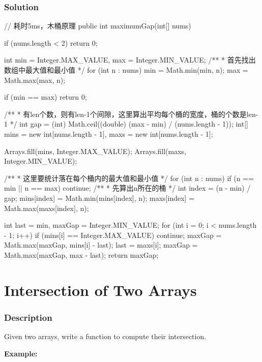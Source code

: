 \subsubsection{Solution}

\begin{Code}
// 耗时5ms，木桶原理
public int maximumGap(int[] nums) {
    if (nums.length < 2) {
        return 0;
    }

    int min = Integer.MAX_VALUE, max = Integer.MIN_VALUE;
    /**
     * 首先找出数组中最大值和最小值
     */
    for (int n : nums) {
        min = Math.min(min, n);
        max = Math.max(max, n);
    }

    if (min == max) {
        return 0;
    }

    /**
     * 有len个数，则有len-1个间隙，这里算出平均每个桶的宽度，桶的个数是len-1
     */
    int gap = (int) Math.ceil((double) (max - min) / (nums.length - 1));
    int[] mins = new int[nums.length - 1], maxs = new int[nums.length - 1];

    Arrays.fill(mins, Integer.MAX_VALUE);
    Arrays.fill(maxs, Integer.MIN_VALUE);

    /**
     * 这里要统计落在每个桶内的最大值和最小值
     */
    for (int n : nums) {
        if (n == min || n == max) {
            continue;
        }
        /**
         * 先算出n所在的桶
         */
        int index = (n - min) / gap;
        mins[index] = Math.min(mins[index], n);
        maxs[index] = Math.max(maxs[index], n);
    }

    int last = min, maxGap = Integer.MIN_VALUE;
    for (int i = 0; i < nums.length - 1; i++) {
        if (mins[i] == Integer.MAX_VALUE) {
            continue;
        }
        maxGap = Math.max(maxGap, mins[i] - last);
        last = maxs[i];
    }
    maxGap = Math.max(maxGap, max - last);
    return maxGap;
}
\end{Code}

\newpage

\section{Intersection of Two Arrays} %

\subsubsection{Description}
Given two arrays, write a function to compute their intersection.

\textbf{Example:}

